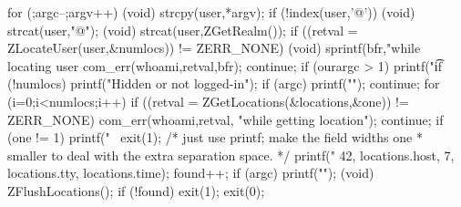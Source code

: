 \begin{code}
{        for (;argc--;argv++) {
                (void) strcpy(user,*argv);
                if (!index(user,'@')) {
                        (void) strcat(user,"@");
                        (void) strcat(user,ZGetRealm());
                } 
                if ((retval = ZLocateUser(user,&numlocs)) != ZERR_NONE) {
                        (void) sprintf(bfr,"while locating user %
                        com_err(whoami,retval,bfr);
                        continue;
                }
                if (ourargc > 1)
                        printf("\t%
                if (!numlocs) {
                        printf("Hidden or not logged-in\n");
                        if (argc)
                                printf("\n");
                        continue;
                }
                for (i=0;i<numlocs;i++) {
                        if ((retval = ZGetLocations(&locations,&one))
                            != ZERR_NONE) {
                                com_err(whoami,retval,
                                        "while getting location");
                                continue;
                        }
                        if (one != 1) {
                                printf("\
                                exit(1);
                        }
                        /* just use printf; make the field widths one
                         * smaller to deal with the extra separation space.
                         */
                        printf("%
                               42, locations.host,
                               7, locations.tty,
                               locations.time);
                        found++;
                }
                if (argc)
                        printf("\n");
                (void) ZFlushLocations();
        }
        if (!found)
            exit(1);
        exit(0);
}
\end{code}
